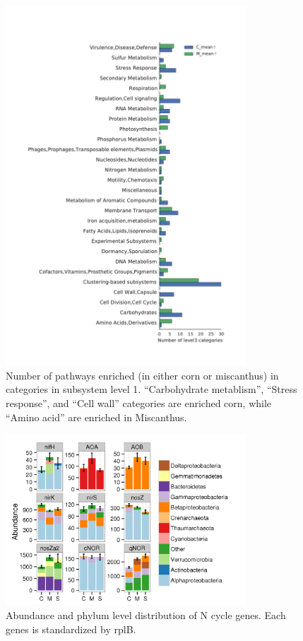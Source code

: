 \documentclass[12pt]{article}
\begin{document}
    \begin{figure}[tbph!]
    \centering
    \includegraphics[width=0.8\textwidth]{figures/subsys-enrich-CvM}
    \caption[Number of pathways enriched in categories in subsystem level 1]{Number of pathways enriched (in either corn or miscanthus) in categories in subsystem level 1. ``Carbohydrate metablism'', ``Stress response'', and ``Cell wall'' categories are enriched corn, while ``Amino acid'' are enriched in Miscanthus.}
    \label{fig:subsys-enrich-CvM}
    \end{figure}



    \begin{figure}[tbph!]
    \centering
    \includegraphics[width=0.8\textwidth]{figures/xander-ncycle-abun}
    \caption[Abundance and phylum level distribution of N cycle genes]{Abundance and phylum level distribution of N cycle genes. Each genes is standardized by rplB.}
    \label{fig:xander-ncycle-abun}
    \end{figure}
\end{document}
